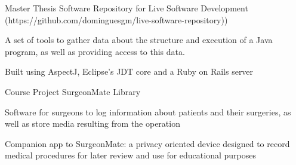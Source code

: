 

\begin{cventries}

  \cventry
    {Master Thesis} %
    {Software Repository for Live Software Development  ({\tiny https://github.com/dominguesgm/live-software-repository)})} %
    {} %
    {} %
    {
      \begin{cvitems} %
        \item {A set of tools to gather data about the structure and execution of a Java program, as well as providing access to this data.}
        \item {Built using AspectJ, Eclipse's JDT core and a Ruby on Rails server}
      \end{cvitems}
    }


\cventry
    {Course Project}
    {SurgeonMate Library}
    {}
    {}
    {
     \begin{cvitems} %
        \item {Software for surgeons to log information about patients and their surgeries, as well as store media resulting from the operation}
        \item{Companion app to SurgeonMate: a privacy oriented device designed to record medical procedures for later review and use for educational purposes}
      \end{cvitems}
    }

\end{cventries}


